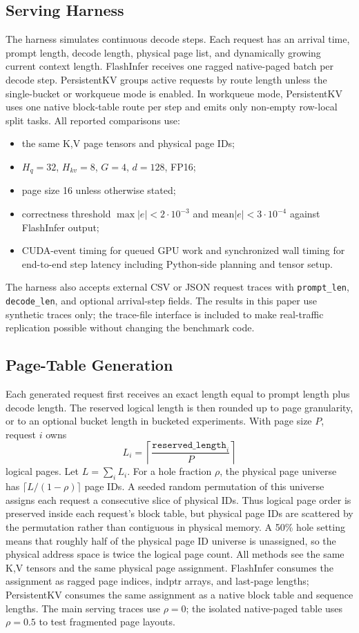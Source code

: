 \documentclass[10pt]{article}
\begin{document}
\subsection{Serving Harness}

The harness simulates continuous decode steps. Each request has an arrival
time, prompt length, decode length, physical page list, and dynamically growing
current context length. FlashInfer receives one ragged native-paged batch per
decode step. PersistentKV groups active requests by route length unless the
single-bucket or workqueue mode is enabled. In workqueue mode, PersistentKV
uses one native block-table route per step and emits only non-empty row-local
split tasks. All reported comparisons use:
\begin{itemize}
  \item the same K,V page tensors and physical page IDs;
  \item $H_q=32$, $H_{kv}=8$, $G=4$, $d=128$, FP16;
  \item page size 16 unless otherwise stated;
  \item correctness threshold $\max |e| < 2\cdot 10^{-3}$ and
  $\mathrm{mean}|e| < 3\cdot 10^{-4}$ against FlashInfer output;
  \item CUDA-event timing for queued GPU work and synchronized wall timing for
  end-to-end step latency including Python-side planning and tensor setup.
\end{itemize}
The harness also accepts external CSV or JSON request traces with
\texttt{prompt\_len}, \texttt{decode\_len}, and optional arrival-step fields.
The results in this paper use synthetic traces only; the trace-file interface
is included to make real-traffic replication possible without changing the
benchmark code.

\subsection{Page-Table Generation}

Each generated request first receives an exact length equal to prompt length
plus decode length. The reserved logical length is then rounded up to page
granularity, or to an optional bucket length in bucketed experiments. With page
size $P$, request $i$ owns
\[
L_i = \left\lceil \frac{\texttt{reserved\_length}_i}{P} \right\rceil
\]
logical pages. Let $L=\sum_i L_i$. For a hole fraction $\rho$, the physical
page universe has $\lceil L/(1-\rho)\rceil$ page IDs. A seeded random
permutation of this universe assigns each request a consecutive slice of
physical IDs. Thus logical page order is preserved inside each request's block
table, but physical page IDs are scattered by the permutation rather than
contiguous in physical memory. A 50\% hole
setting means that roughly half of the physical page ID universe is unassigned,
so the physical address space is twice the logical page count. All methods see
the same K,V tensors and the same physical page assignment. FlashInfer consumes
the assignment as ragged page indices, indptr arrays, and last-page lengths;
PersistentKV consumes the same assignment as a native block table and sequence
lengths. The main serving traces use $\rho=0$; the isolated native-paged table
uses $\rho=0.5$ to test fragmented page layouts.
\end{document}
